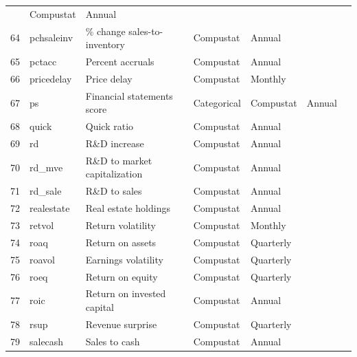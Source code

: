 \documentclass[a4paper, table]{article}
\begin{document}
\begin{landscape}
\begin{center}
\begin{longtable}{llllllll}
				\cite{abarbanell_abnormal_1998} & Compustat & Annual \\
			64 & pchsaleinv\footnotemark[\value{footnote}] & \% change sales-to-inventory & 
				\cite{ou_financial_1989} & Compustat & Annual \\
			65 & pctacc\footnotemark[\value{footnote}] & Percent accruals & 
				\cite{hafzalla_percent_2011} & Compustat & Annual \\
			66 & pricedelay & Price delay & 
				\cite{hou_market_2005} & Compustat & Monthly \\
			67 & ps & Financial statements score & 
				\cite{piotroski_value_2000} & Categorical & Compustat & Annual \\
			68 & quick & Quick ratio & 
				\cite{ou_financial_1989} & Compustat & Annual \\
			69 & rd & R\&D increase & 
				\cite{eberhart_examination_2004} & Compustat & Annual \\
			70 & rd\_mve\footnotemark[\value{footnote}] & R\&D to market capitalization & 
				\cite{guo_explaining_2006} & Compustat & Annual \\
			71 & rd\_sale\footnotemark[\value{footnote}] & R\&D to sales & 
				\cite{guo_explaining_2006} & Compustat & Annual \\
			72 & realestate\footnotemark[\value{footnote}] & Real estate holdings & 
				\cite{tuzel_corporate_2010} & Compustat & Annual \\
			73 & retvol & Return volatility & 
				\cite{ang_cross-section_2006} & Compustat & Monthly \\
			74 & roaq & Return on assets & 
				\cite{balakrishnan_post_2010} & Compustat & Quarterly \\
			75 & roavol\footnotemark[\value{footnote}] & Earnings volatility & 
				\cite{francis_costs_2004} & Compustat & Quarterly \\
			76 & roeq & Return on equity & 
				\cite{hou_digesting_2015} & Compustat & Quarterly \\
			77 & roic & Return on invested capital & 
				\cite{brown_productivity_2007} & Compustat & Annual \\
			78 & rsup & Revenue surprise & 
				\cite{kama_market_2009} & Compustat & Quarterly \\
			79 & salecash & Sales to cash & 
				\cite{ou_financial_1989} & Compustat & Annual \\

\end{longtable}
\end{center}
\end{landscape}
\end{document}
